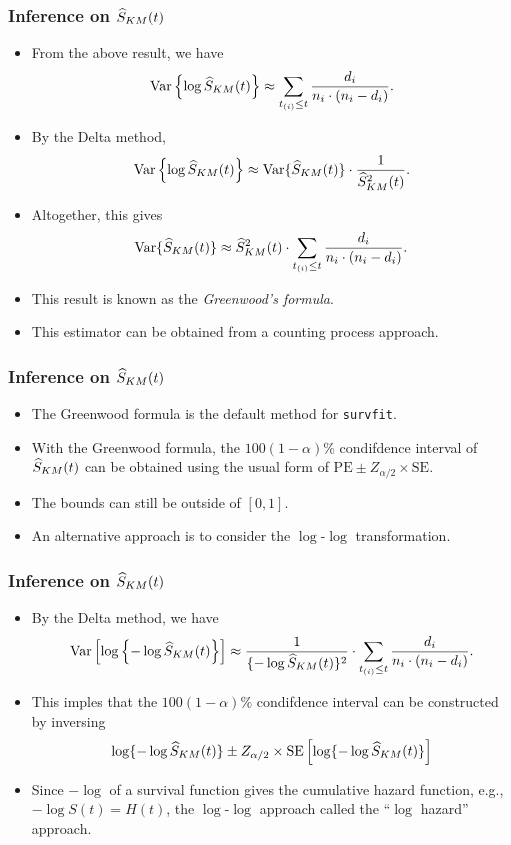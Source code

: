 \documentclass[10pt]{beamer}\usepackage[]{graphicx}\usepackage[]{color}
\newcommand{\Var}{\mathrm{Var}}
\newcommand{\SE}{\mathrm{SE}}
\newcommand{\Skm}{\widehat{S}_{\scriptsize{KM}}}
\begin{document}
\begin{frame}
  \frametitle{Inference on $\Skm(t)$}
  \begin{itemize}
  \item From the above result, we have
    $$\Var\left\{\log\Skm(t)\right\} \approx \sum_{t_{(i)}\le t}\frac{d_i}{n_i\cdot(n_i-d_i)}. $$
  \item By the Delta method, 
    $$\Var\left\{\log\Skm(t)\right\} \approx \Var\{\Skm(t)\} \cdot \frac{1}{\Skm^2(t)}.$$ 
  \item Altogether, this gives
    $$ \Var\{\Skm(t)\} \approx \Skm^2(t)\cdot\sum_{t_{(i)}\le t}\frac{d_i}{n_i\cdot(n_i-d_i)}.$$
  \item This result is known as the \emph{Greenwood's formula}.
  \item This estimator can be obtained from a counting process approach.
  \end{itemize}
\end{frame}


\begin{frame}
  \frametitle{Inference on $\Skm(t)$}
  \begin{itemize}
  \item The Greenwood formula is the default method for \texttt{survfit}.
  \item With the Greenwood formula, the $100(1- \alpha)\%$ condifdence interval of $\Skm(t)$ can be obtained using the usual form of $\mbox{PE}\pm Z_{\alpha/2}\times\mbox{SE}$.
  \item The bounds can still be outside of $[0, 1]$.
  \item An alternative approach is to consider the $\log$-$\log$ transformation.
  \end{itemize}
\end{frame}


\begin{frame}
  \frametitle{Inference on $\Skm(t)$}
  \begin{itemize}
  \item By the Delta method, we have
    \begin{equation*}
      \Var\left[\log\left\{-\log \Skm(t)\right\}\right] \approx 
      \frac{1}{\{-\log\Skm(t)\}^2} \cdot\sum_{t_{(i)}\le t}\frac{d_i}{n_i\cdot(n_i-d_i)}.
    \end{equation*}
  \item This imples that the $100(1- \alpha)\%$ condifdence interval can be constructed by inversing 
    \begin{equation*}
      \log\{-\log\Skm(t)\} \pm Z_{\alpha/2} \times \SE\left[\log\{-\log\Skm(t)\}\right]
    \end{equation*}
  \item Since $-\log$ of a survival function gives the cumulative hazard function, e.g., $-\log S(t) = H(t)$, 
    the $\log$-$\log$ approach called the ``$\log$ hazard'' approach. 
  \end{itemize}
\end{frame}
\end{document}

